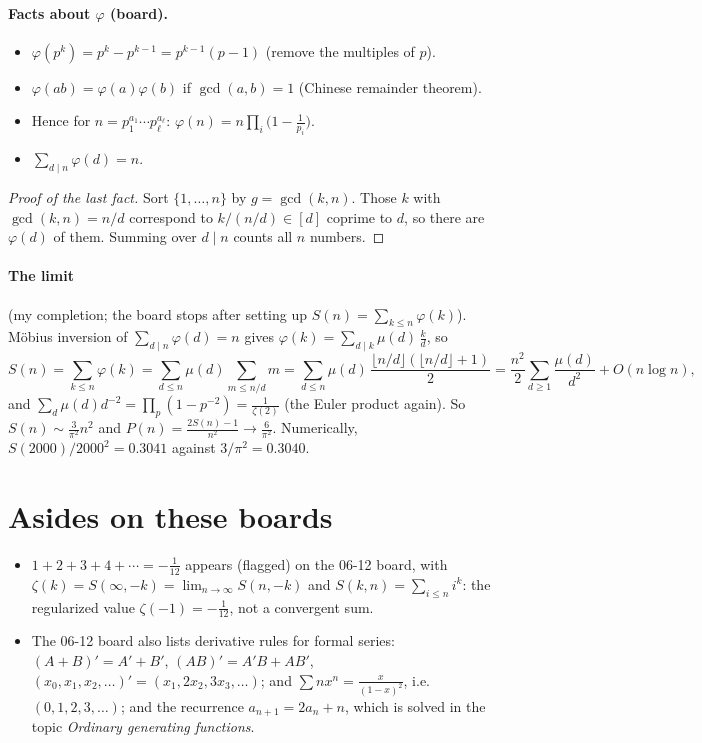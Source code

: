 \documentclass[11pt]{article}
\begin{document}
\paragraph{Facts about $\varphi$ (board).}
\begin{itemize}[nosep]
  \item $\varphi(p^k)=p^k-p^{k-1}=p^{k-1}(p-1)$ (remove the multiples of $p$).
  \item $\varphi(ab)=\varphi(a)\varphi(b)$ if $\gcd(a,b)=1$ (Chinese remainder theorem).
  \item Hence for $n=p_1^{a_1}\cdots p_\ell^{a_\ell}$: $\varphi(n)=n\prod_i\bigl(1-\frac1{p_i}\bigr)$.
  \item $\sum_{d\mid n}\varphi(d)=n$.
\end{itemize}
\begin{proof}[Proof of the last fact]
Sort $\{1,\dots,n\}$ by $g=\gcd(k,n)$. Those $k$ with $\gcd(k,n)=n/d$ correspond to $k/(n/d)\in[d]$ coprime to $d$, so there are $\varphi(d)$ of them. Summing over $d\mid n$ counts all $n$ numbers.
\end{proof}

\paragraph{The limit} (my completion; the board stops after setting up $S(n)=\sum_{k\le n}\varphi(k)$). M\"obius inversion of $\sum_{d\mid n}\varphi(d)=n$ gives $\varphi(k)=\sum_{d\mid k}\mu(d)\,\frac kd$, so
\[
S(n)=\sum_{k\le n}\varphi(k)=\sum_{d\le n}\mu(d)\sum_{m\le n/d}m
=\sum_{d\le n}\mu(d)\,\frac{\lfloor n/d\rfloor(\lfloor n/d\rfloor+1)}2
=\frac{n^2}2\sum_{d\ge1}\frac{\mu(d)}{d^2}+O(n\log n),
\]
and $\sum_d\mu(d)d^{-2}=\prod_p(1-p^{-2})=\frac1{\zeta(2)}$ (the Euler product again). So $S(n)\sim\frac{3}{\pi^2}n^2$ and $P(n)=\frac{2S(n)-1}{n^2}\to\frac6{\pi^2}$. Numerically, $S(2000)/2000^2=0.3041$ against $3/\pi^2=0.3040$.

\section*{Asides on these boards}
\begin{itemize}[nosep]
  \item $1+2+3+4+\cdots=-\frac1{12}$ appears (flagged) on the 06-12 board, with $\zeta(k)=S(\infty,-k)=\lim_{n\to\infty}S(n,-k)$ and $S(k,n)=\sum_{i\le n}i^k$: the regularized value $\zeta(-1)=-\frac1{12}$, not a convergent sum.
  \item The 06-12 board also lists derivative rules for formal series: $(A+B)'=A'+B'$, $(AB)'=A'B+AB'$, $(x_0,x_1,x_2,\dots)'=(x_1,2x_2,3x_3,\dots)$; and $\sum nx^n=\frac x{(1-x)^2}$, i.e.\ $(0,1,2,3,\dots)$; and the recurrence $a_{n+1}=2a_n+n$, which is solved in the topic \emph{Ordinary generating functions}.
\end{itemize}
\end{document}
